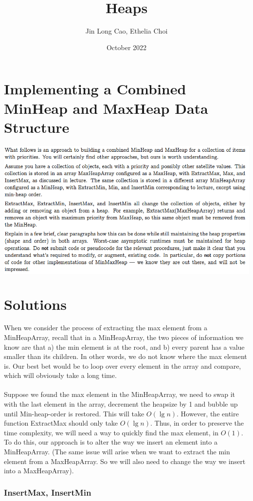 \documentclass{article}
\title{Heaps}
\author{Jin Long Cao, Ethelia Choi}
\date{October 2022}
\begin{document}
\maketitle
\section*{Implementing a Combined MinHeap and MaxHeap Data Structure}
\includegraphics[width=\textwidth]{Heaps2}
\section*{Solutions}
When we consider the process of extracting the max element from a MinHeapArray, recall that in a MinHeapArray, the two pieces of information we know are that a) the min element is at the root, and b) every parent has a value smaller than its children. In other words, we do not know where the max element is. Our best bet would be to loop over every element in the array and compare, which will obviously take a long time. \\~\\
Suppose we found the max element in the MinHeapArray, we need to swap it with the last element in the array, decrement the heapsize by 1 and bubble up until Min-heap-order is restored. This will take $O(\lg n)$. However, the entire function ExtractMax should only take $O(\lg n)$. Thus, in order to preserve the time complexity, we will need a way to quickly find the max element, in $O(1)$. To do this, our approach is to alter the way we insert an element into a MinHeapArray. (The same issue will arise when we want to extract the min element from a MaxHeapArray. So we will also need to change the way we insert into a MaxHeapArray). 


\subsubsection*{InsertMax, InsertMin}
\end{document}
